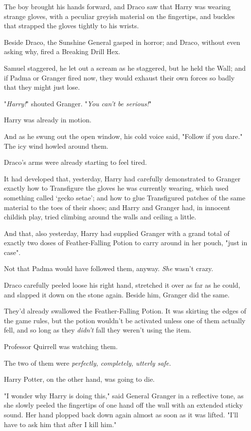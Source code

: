 The boy brought his hands forward, and Draco saw that Harry was wearing strange
gloves, with a peculiar greyish material on the fingertips, and buckles that
strapped the gloves tightly to his wrists.

Beside Draco, the Sunshine General gasped in horror; and Draco, without even
asking why, fired a Breaking Drill Hex.

Samuel staggered, he let out a scream as he staggered, but he held the Wall;
and if Padma or Granger fired now, they would exhaust their own forces so badly
that they might just lose.

"\emph{Harry!}" shouted Granger. "\emph{You can't be serious!}"

Harry was already in motion.

And as he swung out the open window, his cold voice said, "Follow if you dare."
\sbreak
The icy wind howled around them.

Draco's arms were already starting to feel tired.

{\el} It had developed that, yesterday, Harry had carefully demonstrated to
Granger exactly how to Transfigure the gloves he was currently wearing, which
used something called `gecko setae'; and how to glue Transfigured patches of
the same material to the toes of their shoes; and Harry and Granger had, in
innocent childish play, tried climbing around the walls and ceiling a little.

And that, also yesterday, Harry had supplied Granger with a grand total of
exactly two doses of Feather-Falling Potion to carry around in her pouch, "just
in case".

Not that Padma would have followed them, anyway. \emph{She} wasn't crazy.

Draco carefully peeled loose his right hand, stretched it over as far as he
could, and slapped it down on the stone again. Beside him, Granger did the same.

They'd already swallowed the Feather-Falling Potion. It was skirting the edges
of the game rules, but the potion wouldn't be activated unless one of them
actually fell, and so long as they \emph{didn't} fall they weren't using the
item.

Professor Quirrell was watching them.

The two of them were \emph{perfectly, completely, utterly safe.}

Harry Potter, on the other hand, was going to die.

"I wonder why Harry is doing this," said General Granger in a reflective tone,
as she slowly peeled the fingertips of one hand off the wall with an extended
sticky sound. Her hand plopped back down again almost as soon as it was lifted.
"I'll have to ask him that after I kill him."


